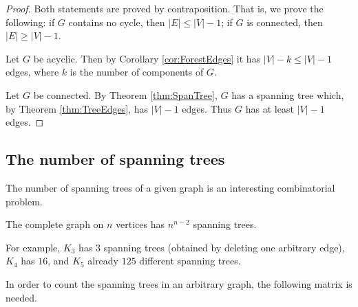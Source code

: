 \begin{page}
\setcounter{section}{2}
\setcounter{subsection}{5}
\setcounter{dfn}{12}
\label{portion:247}

\begin{proof}
Both statements are proved by contraposition.
That is, we prove the following: if $G$ contains no cycle, then $|E| \le |V| - 1$; if $G$ is connected, then $|E| \ge |V| - 1$.

Let $G$ be acyclic.
Then by Corollary \ref{cor:ForestEdges} it has $|V| - k \le |V| - 1$ edges, where $k$ is the number of components of $G$.

Let $G$ be connected.
By Theorem \ref{thm:SpanTree}, $G$ has a spanning tree which, by Theorem \ref{thm:TreeEdges}, has $|V| - 1$ edges.
Thus $G$ has at least $|V| - 1$ edges.
\end{proof}





\end{page}

\begin{page}
\setcounter{section}{2}
\setcounter{subsection}{5}
\setcounter{dfn}{12}
\label{portion:248}

\subsection{The number of spanning trees}
The number of spanning trees of a given graph is an interesting combinatorial problem.


\end{page}

\begin{page}
\setcounter{section}{2}
\setcounter{subsection}{5}
\setcounter{dfn}{13}
\label{portion:250}

\begin{thm}
The complete graph on $n$ vertices has $n^{n-2}$ spanning trees.
\end{thm}

\end{page}

\begin{page}
\setcounter{section}{2}
\setcounter{subsection}{5}
\setcounter{dfn}{13}
\label{portion:251}

For example, $K_3$ has $3$ spanning trees (obtained by deleting one arbitrary edge),
$K_4$ has $16$, and $K_5$ already $125$ different spanning trees.

In order to count the spanning trees in an arbitrary graph, the following matrix is needed.

\end{page}

